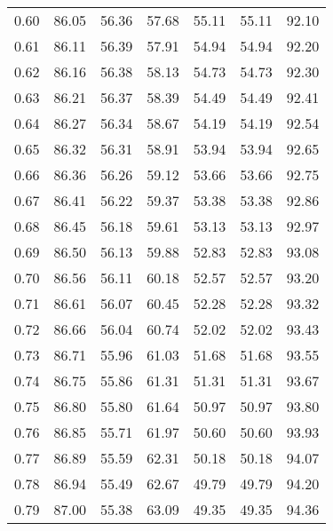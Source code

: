 \begin{tabular}{|c|c|c|c|c|c|c|}
      0.60 &     86.05 &     56.36 &      57.68 &   55.11 &      55.11 &         92.10 \\
      0.61 &     86.11 &     56.39 &      57.91 &   54.94 &      54.94 &         92.20 \\
      0.62 &     86.16 &     56.38 &      58.13 &   54.73 &      54.73 &         92.30 \\
      0.63 &     86.21 &     56.37 &      58.39 &   54.49 &      54.49 &         92.41 \\
      0.64 &     86.27 &     56.34 &      58.67 &   54.19 &      54.19 &         92.54 \\
      0.65 &     86.32 &     56.31 &      58.91 &   53.94 &      53.94 &         92.65 \\
      0.66 &     86.36 &     56.26 &      59.12 &   53.66 &      53.66 &         92.75 \\
      0.67 &     86.41 &     56.22 &      59.37 &   53.38 &      53.38 &         92.86 \\
      0.68 &     86.45 &     56.18 &      59.61 &   53.13 &      53.13 &         92.97 \\
      0.69 &     86.50 &     56.13 &      59.88 &   52.83 &      52.83 &         93.08 \\
      0.70 &     86.56 &     56.11 &      60.18 &   52.57 &      52.57 &         93.20 \\
      0.71 &     86.61 &     56.07 &      60.45 &   52.28 &      52.28 &         93.32 \\
      0.72 &     86.66 &     56.04 &      60.74 &   52.02 &      52.02 &         93.43 \\
      0.73 &     86.71 &     55.96 &      61.03 &   51.68 &      51.68 &         93.55 \\
      0.74 &     86.75 &     55.86 &      61.31 &   51.31 &      51.31 &         93.67 \\
      0.75 &     86.80 &     55.80 &      61.64 &   50.97 &      50.97 &         93.80 \\
      0.76 &     86.85 &     55.71 &      61.97 &   50.60 &      50.60 &         93.93 \\
      0.77 &     86.89 &     55.59 &      62.31 &   50.18 &      50.18 &         94.07 \\
      0.78 &     86.94 &     55.49 &      62.67 &   49.79 &      49.79 &         94.20 \\
      0.79 &     87.00 &     55.38 &      63.09 &   49.35 &      49.35 &         94.36 \\

\end{tabular}
